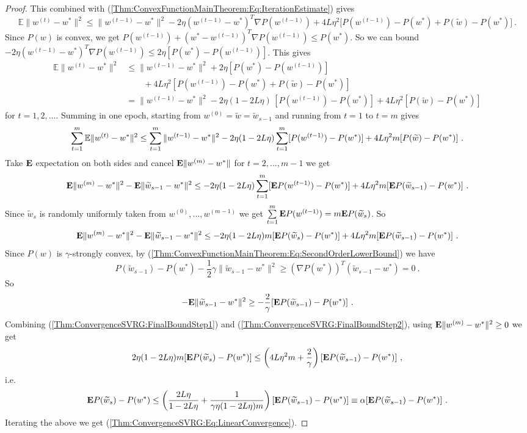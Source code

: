 \begin{proof}
This combined with (\ref{Thm:ConvexFunctionMainTheorem:Eq:IterationEstimate}) gives 
$$
\mathbb{E}\|w^{(t)}-w^*\|^2
\leq
\|w^{(t-1)}-w^*\|^2
-
2\eta (w^{(t-1)}-w^*)^{T}\nabla P(w^{(t-1)})
+
4L\eta^2\Big[P(w^{(t-1)})-P(w^*)+P(\widetilde w)-P(w^*)\Big] \ .
$$
Since $P(w)$ is convex, we get $P(w^{(t-1)})+(w^*-w^{(t-1)})^{T}\nabla P(w^{(t-1)})\le P(w^*)$. So we can bound $-2\eta (w^{(t-1)}-w^*)^{T}\nabla P(w^{(t-1)})\leq
2\eta [P(w^*)-P(w^{(t-1)})]$. This gives
$$\begin{array}{ll}
\mathbb{E}\|w^{(t)}-w^*\|^2 & \le
\|w^{(t-1)}-w^*\|^2
+
2\eta [P(w^*)-P(w^{(t-1)})]
\\
& \qquad +
4L\eta^2 [P(w^{(t-1)})-P(w^*)+P(\tilde w)-P(w^*)]
\\
& =
\|w^{(t-1)}-w^*\|^2
-
2\eta (1-2L\eta)\,[P(w^{(t-1)})-P(w^*)]
+
4L\eta^2 [P(\widetilde w)-P(w^*)]
\end{array}
$$
for $t=1,2,...$. Summing in one epoch, starting from $w^{(0)}=\widetilde{w}=\widetilde{w}_{s-1}$ and running from $t=1$ to $t=m$ gives 
$$\sum\limits_{t=1}^m \mathbb{E}\|w^{(t)}-w^*\|^2\leq \sum\limits_{t=1}^m \|w^{(t-1)}-w^*\|^2-2\eta(1-2L\eta)\sum\limits_{t=1}^m [P(w^{(t-1)})-P(w^*)]+4L\eta^2m [P(\widetilde{w})-P(w^*)] \ .$$
Take $\mathbf E$ expectation on both sides and cancel $\mathbf E\|w^{(m)}-w^*\|$ for $t=2,...,m-1$ we get
$$\mathbf E\|w^{(m)}-w^*\|^2-\mathbf E\|\widetilde{w}_{s-1}-w^*\|^2\leq -2\eta(1-2L\eta)\sum\limits_{t=1}^m [\mathbf E P(w^{(t-1)})-P(w^*)]+4L\eta^2m [\mathbf E P(\widetilde{w}_{s-1})-P(w^*)] \ .$$
Since $\widetilde{w}_s$ is randomly uniformly taken from $w^{(0)},...,w^{(m-1)}$ we get $\sum\limits_{t=1}^m \mathbf E P(w^{(t-1)})=m\mathbf E P(\widetilde{w}_s)$. So 
\begin{equation}\label{Thm:ConvergenceSVRG:FinalBoundStep1}
\mathbf E\|w^{(m)}-w^*\|^2-\mathbf E\|\widetilde{w}_{s-1}-w^*\|^2\leq -2\eta(1-2L\eta)m[\mathbf E P(\widetilde{w}_s)-P(w^*)]+4L\eta^2m [\mathbf E P(\widetilde{w}_{s-1})-P(w^*)] \ .
\end{equation}
Since $P(w)$ is $\gamma$-strongly convex, by (\ref{Thm:ConvexFunctionMainTheorem:Eq:SecondOrderLowerBound}) we have
$$
P(\widetilde{w}_{s-1})-P(w^*)-\frac{1}{2}\gamma \|\widetilde{w}_{s-1}-w^*\|^2
\ge
(\nabla P(w^*))^{T}(\widetilde{w}_{s-1}-w^*)=0 \ .
$$
So \begin{equation}\label{Thm:ConvergenceSVRG:FinalBoundStep2}
-\mathbf E\|\widetilde{w}_{s-1}-w^*\|^2\geq -\dfrac{2}{\gamma}[\mathbf E P(\widetilde{w}_{s-1})-P(w^*)] \ .
\end{equation}
Combining (\ref{Thm:ConvergenceSVRG:FinalBoundStep1}) and (\ref{Thm:ConvergenceSVRG:FinalBoundStep2}), using $\mathbf E\|w^{(m)}-w^*\|^2\geq 0$ we get
$$2\eta (1-2L\eta)m [\mathbf E P(\widetilde{w}_s)-P(w^*)]\leq \left(4L\eta^2 m +\dfrac{2}{\gamma}\right)[\mathbf E P(\widetilde{w}_{s-1})-P(w^*)] \ ,$$
i.e.
$$\mathbf E P(\widetilde{w}_s)-P(w^*) \leq \left(\dfrac{2L\eta}{1-2L\eta} +\dfrac{1}{\gamma\eta (1-2L\eta)m}\right)[\mathbf E P(\widetilde{w}_{s-1})-P(w^*)]\equiv \alpha [\mathbf E P(\widetilde{w}_{s-1})-P(w^*)] \ .$$
Iterating the above we get (\ref{Thm:ConvergenceSVRG:Eq:LinearConvergence}).
\end{proof}

